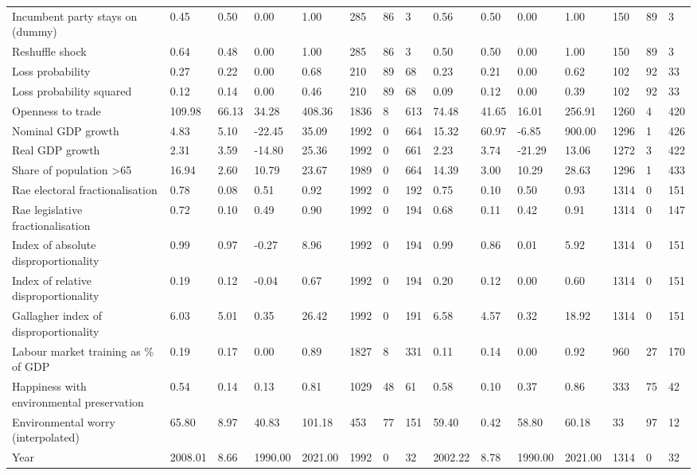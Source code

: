 \begin{longtable}{lllllllllllllll}
Incumbent party stays on (dummy) & 0.45 & 0.50 & 0.00 & 1.00 & 285 & 86 & 3 & 0.56 & 0.50 & 0.00 & 1.00 & 150 & 89 & 3\\
Reshuffle shock & 0.64 & 0.48 & 0.00 & 1.00 & 285 & 86 & 3 & 0.50 & 0.50 & 0.00 & 1.00 & 150 & 89 & 3\\
\addlinespace
Loss probability & 0.27 & 0.22 & 0.00 & 0.68 & 210 & 89 & 68 & 0.23 & 0.21 & 0.00 & 0.62 & 102 & 92 & 33\\
Loss probability squared & 0.12 & 0.14 & 0.00 & 0.46 & 210 & 89 & 68 & 0.09 & 0.12 & 0.00 & 0.39 & 102 & 92 & 33\\
Openness to trade & 109.98 & 66.13 & 34.28 & 408.36 & 1836 & 8 & 613 & 74.48 & 41.65 & 16.01 & 256.91 & 1260 & 4 & 420\\
Nominal GDP growth & 4.83 & 5.10 & -22.45 & 35.09 & 1992 & 0 & 664 & 15.32 & 60.97 & -6.85 & 900.00 & 1296 & 1 & 426\\
Real GDP growth & 2.31 & 3.59 & -14.80 & 25.36 & 1992 & 0 & 661 & 2.23 & 3.74 & -21.29 & 13.06 & 1272 & 3 & 422\\
\addlinespace
Share of population >65 & 16.94 & 2.60 & 10.79 & 23.67 & 1989 & 0 & 664 & 14.39 & 3.00 & 10.29 & 28.63 & 1296 & 1 & 433\\
Rae electoral fractionalisation & 0.78 & 0.08 & 0.51 & 0.92 & 1992 & 0 & 192 & 0.75 & 0.10 & 0.50 & 0.93 & 1314 & 0 & 151\\
Rae legislative fractionalisation & 0.72 & 0.10 & 0.49 & 0.90 & 1992 & 0 & 194 & 0.68 & 0.11 & 0.42 & 0.91 & 1314 & 0 & 147\\
Index of absolute disproportionality & 0.99 & 0.97 & -0.27 & 8.96 & 1992 & 0 & 194 & 0.99 & 0.86 & 0.01 & 5.92 & 1314 & 0 & 151\\
Index of relative disproportionality & 0.19 & 0.12 & -0.04 & 0.67 & 1992 & 0 & 194 & 0.20 & 0.12 & 0.00 & 0.60 & 1314 & 0 & 151\\
\addlinespace
Gallagher index of disproportionality & 6.03 & 5.01 & 0.35 & 26.42 & 1992 & 0 & 191 & 6.58 & 4.57 & 0.32 & 18.92 & 1314 & 0 & 151\\
Labour market training as \% of GDP & 0.19 & 0.17 & 0.00 & 0.89 & 1827 & 8 & 331 & 0.11 & 0.14 & 0.00 & 0.92 & 960 & 27 & 170\\
Happiness with environmental preservation & 0.54 & 0.14 & 0.13 & 0.81 & 1029 & 48 & 61 & 0.58 & 0.10 & 0.37 & 0.86 & 333 & 75 & 42\\
Environmental worry (interpolated) & 65.80 & 8.97 & 40.83 & 101.18 & 453 & 77 & 151 & 59.40 & 0.42 & 58.80 & 60.18 & 33 & 97 & 12\\
Year & 2008.01 & 8.66 & 1990.00 & 2021.00 & 1992 & 0 & 32 & 2002.22 & 8.78 & 1990.00 & 2021.00 & 1314 & 0 & 32\\
\bottomrule
\end{longtable}

